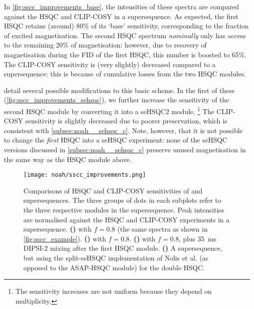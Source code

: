 In \cref{fig:sscc_improvements_base}, the intensities of these spectra are compared against the HSQC and CLIP-COSY in a  supersequence.
As expected, the first HSQC retains (around) 80\% of its `base' sensitivity, corresponding to the fraction of excited magnetisation.
The second HSQC spectrum \textit{nominally} only has access to the remaining 20\% of magnetisation: however, due to recovery of  magnetisation during the FID of the first HSQC, this number is boosted to 65\%.
The CLIP-COSY sensitivity is (very slightly) decreased compared to a  supersequence: this is because of cumulative losses from the two HSQC modules.

 detail several possible modifications to this basic scheme.
In the first of these (\cref{fig:sscc_improvements_sehsqc}), we further increase the sensitivity of the second HSQC module by converting it into a seHSQC2 module.%
\footnote{The sensitivity increases are not uniform because they depend on multiplicity.}
The CLIP-COSY sensitivity is slightly decreased due to poorer  preservation, which is consistent with \cref{subsec:noah__sehsqc_c}.
Note, however, that it is not possible to change the \textit{first} HSQC into a seHSQC experiment: none of the seHSQC versions discussed in \cref{subsec:noah__sehsqc_c} preserve unused  magnetisation in the same way as the HSQC module above.

\begin{figure}[!ht]
    \centering
    \texttt{[image: noah/sscc\_improvements.png]}%
    {\label{fig:sscc_improvements_base}}%
    {\label{fig:sscc_improvements_sehsqc}}%
    {\label{fig:sscc_improvements_dipsi}}%
    {\label{fig:sscc_improvements_split_sehsqc}}%
    \caption[Sensitivity comparisons for  and  supersequences]{
        Comparisons of HSQC and CLIP-COSY sensitivities of  and  supersequences.
        The three groups of dots in each subplots refer to the three respective modules in the supersequence.
        Peak intensities are normalised against the HSQC and CLIP-COSY experiments in a  supersequence.
        \textbf{()}  with $f = 0.8$ (the same spectra as shown in \cref{fig:sscc_example}).
        \textbf{()}  with $f = 0.8$.
        \textbf{()}  with $f = 0.8$, plus \qty{35}{\ms} DIPSI-2 mixing after the first HSQC module.
        \textbf{()} A  supersequence, but using the split-seHSQC implementation of Nolis et al.\autocite{Nolis2019CPC} (as opposed to the ASAP-HSQC module) for the double HSQC.
    }
    \label{fig:sscc_improvements}
\end{figure}

